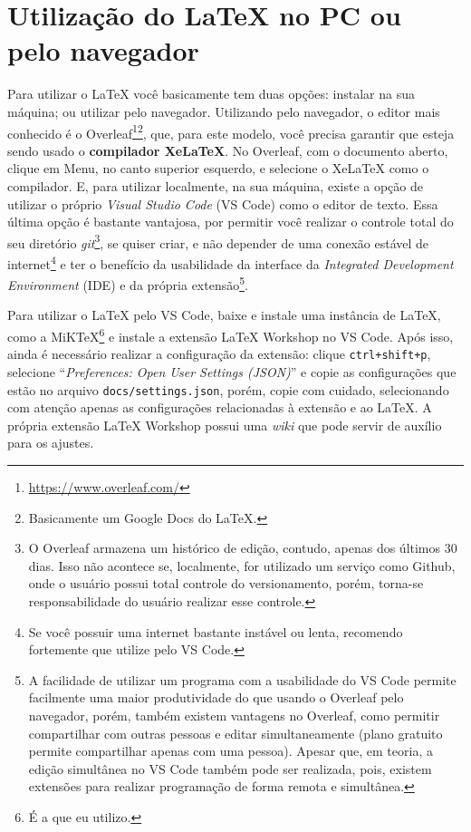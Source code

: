 \section{Utilização do \LaTeX{} no PC ou pelo navegador}
Para utilizar o \LaTeX{} você basicamente tem duas opções: instalar na sua máquina; ou utilizar pelo navegador. Utilizando pelo navegador, o editor mais conhecido é o Overleaf\footnote{\url{https://www.overleaf.com/}}\footnote{Basicamente um Google Docs do \LaTeX{}.}, que, para este modelo, você precisa garantir que esteja sendo usado o \textbf{compilador XeLaTeX}. No Overleaf, com o documento aberto, clique em Menu, no canto superior esquerdo, e selecione o XeLaTeX como o compilador. E, para utilizar localmente, na sua máquina, existe a opção de utilizar o próprio \textit{Visual Studio Code} (VS Code) como o editor de texto. Essa última opção é bastante vantajosa, por permitir você realizar o controle total do seu diretório \textit{git}\footnote{O Overleaf armazena um histórico de edição, contudo, apenas dos últimos 30 dias. Isso não acontece se, localmente, for utilizado um serviço como Github, onde o usuário possui total controle do versionamento, porém, torna-se responsabilidade do usuário realizar esse controle.}, se quiser criar, e não depender de uma conexão estável de internet\footnote{Se você possuir uma internet bastante instável ou lenta, recomendo fortemente que utilize pelo VS Code.} e ter o benefício da usabilidade da interface da \textit{Integrated Development Environment} (IDE) e da própria extensão\footnote{A facilidade de utilizar um programa com a usabilidade do VS Code permite facilmente uma maior produtividade do que usando o Overleaf pelo navegador, porém, também existem vantagens no Overleaf, como permitir compartilhar com outras pessoas e editar simultaneamente (plano gratuito permite compartilhar apenas com uma pessoa). Apesar que, em teoria, a edição simultânea no VS Code também pode ser realizada, pois, existem extensões para realizar programação de forma remota e simultânea.}.

Para utilizar o \LaTeX{} pelo VS Code, baixe e instale uma instância de \LaTeX{}, como a MiKTeX\footnote{É a que eu utilizo.} e instale a extensão LaTeX Workshop no VS Code. Após isso, ainda é necessário realizar a configuração da extensão: clique \texttt{ctrl+shift+p}, selecione ``\textit{Preferences: Open User Settings (JSON)}'' e copie as configurações que estão no arquivo \texttt{docs/settings.json}, porém, copie com cuidado, selecionando com atenção apenas as configurações relacionadas à extensão e ao \LaTeX{}. A própria extensão LaTeX Workshop possui uma \textit{wiki} que pode servir de auxílio para os ajustes.

